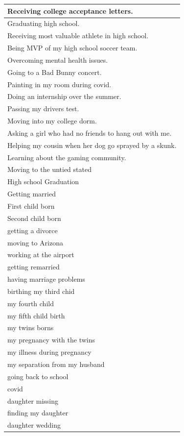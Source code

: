 \documentclass[
  .7em,
  letterpaper,
  DIV=11,
  numbers=noendperiod]{scrartcl}
\begin{document}
\begin{table}
\begin{tabular}{l}
\hline
Receiving college acceptance letters.\\
\hline
Graduating high school.\\
\hline
Receiving most valuable athlete in high school.\\
\hline
Being MVP of my high school soccer team.\\
\hline
Overcoming mental health issues.\\
\hline
Going to a Bad Bunny concert.\\
\hline
Painting in my room during covid.\\
\hline
Doing an internship over the summer.\\
\hline
Passing my drivers test.\\
\hline
Moving into my college dorm.\\
\hline
Asking a girl who had no friends to hang out with me.\\
\hline
Helping my cousin when her dog go sprayed by a skunk.\\
\hline
Learning about the gaming community.\\
\hline
Moving to the untied stated\\
\hline
High school Graduation\\
\hline
Getting married\\
\hline
First child born\\
\hline
Second child born\\
\hline
getting a divorce\\
\hline
moving to Arizona\\
\hline
working at the airport\\
\hline
getting remarried\\
\hline
having marriage problems\\
\hline
birthing my third chid\\
\hline
my fourth child\\
\hline
my fifth child birth\\
\hline
my twins borns\\
\hline
my pregnancy with the twins\\
\hline
my illness during pregnancy\\
\hline
my separation from my husband\\
\hline
going back to school\\
\hline
covid\\
\hline
daughter missing\\
\hline
finding my daughter\\
\hline
daughter wedding\\

\end{tabular}
\end{table}
\end{document}
